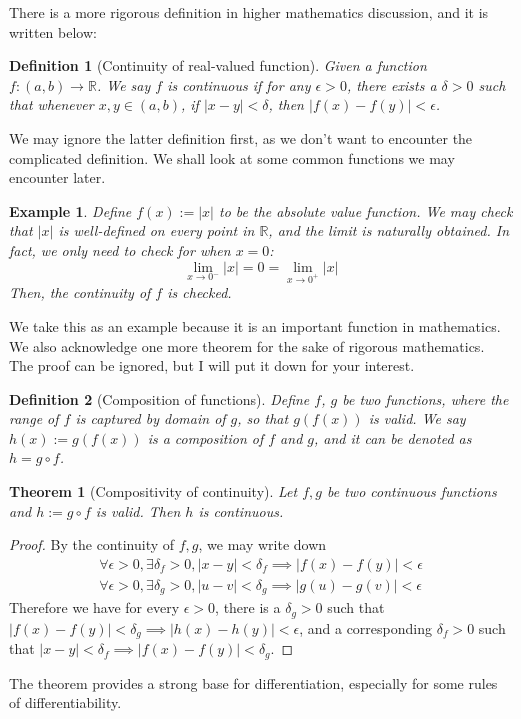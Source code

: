 \documentclass[12pt]{article}
\newtheorem*{definition}{Definition}
\newtheorem*{theorem}{Theorem}
\newtheorem*{example}{Example}
\begin{document}
    There is a more rigorous definition in higher mathematics discussion, and it is written below:
    \begin{definition}[Continuity of real-valued function]
        Given a function $f:(a,b) \to \mathbb{R}$. We say $f$ is continuous if for any $\epsilon>0$, there exists a $\delta>0$ such that whenever $x,y\in(a,b)$, if $|x-y|<\delta$, then $|f(x)-f(y)|<\epsilon$.
    \end{definition}

    We may ignore the latter definition first, as we don't want to encounter the complicated definition. We shall look at some common functions we may encounter later.

    \begin{example}
        Define $f(x):=|x|$ to be the absolute value function. We may check that $|x|$ is well-defined on every point in $\mathbb{R}$, and the limit is naturally obtained. In fact, we only need to check for when $x=0$: $$\lim_{x\to0^-}|x|=0=\lim_{x\to0^+}|x|$$ Then, the continuity of $f$ is checked.
    \end{example}

    We take this as an example because it is an important function in mathematics. We also acknowledge one more theorem for the sake of rigorous mathematics. The proof can be ignored, but I will put it down for your interest.

    \begin{definition}[Composition of functions]
        Define $f$, $g$ be two functions, where the range of $f$ is captured by domain of $g$, so that $g(f(x))$ is valid. We say $h(x):=g(f(x))$ is a composition of $f$ and $g$, and it can be denoted as $h=g\circ f$.
    \end{definition}

    \begin{theorem}[Compositivity of continuity]
        Let $f,g$ be two continuous functions and $h:=g\circ f$ is valid. Then $h$ is continuous.
    \end{theorem}
    \begin{proof}
        By the continuity of $f,g$, we may write down\begin{align*}
            \forall \epsilon>0, \exists \delta_f>0, |x-y|<\delta_f \implies |f(x)-f(y)|<\epsilon\\
            \forall \epsilon>0, \exists \delta_g>0, |u-v|<\delta_g \implies |g(u)-g(v)|<\epsilon
        \end{align*}
        Therefore we have for every $\epsilon>0$, there is a $\delta_g>0$ such that $|f(x)-f(y)|<\delta_g\implies|h(x)-h(y)|<\epsilon$, and a corresponding $\delta_f>0$ such that $|x-y|<\delta_f\implies|f(x)-f(y)|<\delta_g$.
    \end{proof}

    The theorem provides a strong base for differentiation, especially for some rules of differentiability.
\end{document}
